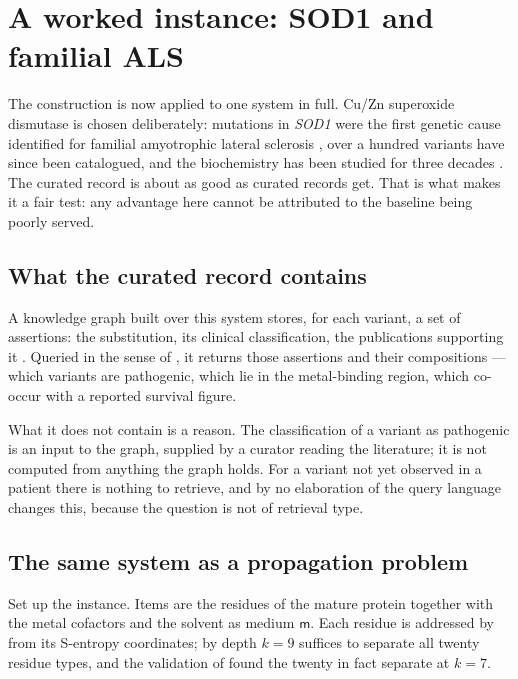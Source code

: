 \documentclass[11pt,twocolumn,a4paper]{article}
\theoremstyle{thmstyle}
\theoremstyle{definition}
\theoremstyle{remark}
\newcommand{\med}{\mathsf{m}}
\begin{document}
\section{A worked instance: SOD1 and familial ALS}
\label{sec:sod1}

The construction is now applied to one system in full. Cu/Zn
superoxide dismutase is chosen deliberately: mutations in \emph{SOD1}
were the first genetic cause identified for familial amyotrophic
lateral sclerosis \citep{rosen1993}, over a hundred variants have since
been catalogued, and the biochemistry has been studied for three
decades \citep{valentine2005}. The curated record is about as good as
curated records get. That is what makes it a fair test: any advantage
here cannot be attributed to the baseline being poorly served.

\subsection{What the curated record contains}

A knowledge graph built over this system stores, for each variant, a
set of assertions: the substitution, its clinical classification, the
publications supporting it \citep{landrum2018}. Queried in the sense of
, it returns those assertions and their
compositions --- which variants are pathogenic, which lie in the
metal-binding region, which co-occur with a reported survival figure.

What it does not contain is a reason. The classification of a variant
as pathogenic is an input to the graph, supplied by a curator reading
the literature; it is not computed from anything the graph holds. For a
variant not yet observed in a patient there is nothing to retrieve, and
by  no elaboration of the query language
changes this, because the question is not of retrieval type.

\subsection{The same system as a propagation problem}

Set up the instance. Items are the residues of the mature protein
together with the metal cofactors and the solvent as medium $\med$.
Each residue is addressed by  from its S-entropy
coordinates; by  depth $k=9$ suffices to
separate all twenty residue types, and the validation of
 found the twenty in fact separate at $k=7$.
\end{document}
